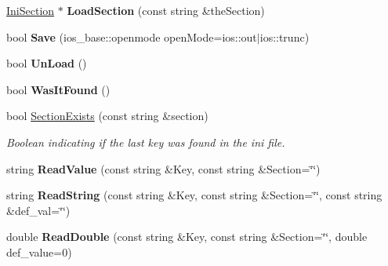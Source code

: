 \begin{DoxyCompactItemize}
\item 
\hypertarget{classrr_1_1_ini_file_af6b76931e49087a27695b7a27ed04a42}{\hyperlink{classrr_1_1_ini_section}{Ini\-Section} $\ast$ {\bfseries Load\-Section} (const string \&the\-Section)}\label{classrr_1_1_ini_file_af6b76931e49087a27695b7a27ed04a42}

\item 
\hypertarget{classrr_1_1_ini_file_a2485647178f4b9c733b5a5abb54b3bf2}{bool {\bfseries Save} (ios\-\_\-base\-::openmode open\-Mode=ios\-::out$|$ios\-::trunc)}\label{classrr_1_1_ini_file_a2485647178f4b9c733b5a5abb54b3bf2}

\item 
\hypertarget{classrr_1_1_ini_file_abd7e7981536ea59c2171ac3304c76ccd}{bool {\bfseries Un\-Load} ()}\label{classrr_1_1_ini_file_abd7e7981536ea59c2171ac3304c76ccd}

\item 
\hypertarget{classrr_1_1_ini_file_aff8ccbf611e3a58769005a6cdc627f8a}{bool {\bfseries Was\-It\-Found} ()}\label{classrr_1_1_ini_file_aff8ccbf611e3a58769005a6cdc627f8a}

\item 
\hypertarget{classrr_1_1_ini_file_a0f6042f001ebab2e3b2e29ae69c10f84}{bool \hyperlink{classrr_1_1_ini_file_a0f6042f001ebab2e3b2e29ae69c10f84}{Section\-Exists} (const string \&section)}\label{classrr_1_1_ini_file_a0f6042f001ebab2e3b2e29ae69c10f84}

\begin{DoxyCompactList}\small\item\em Boolean indicating if the last key was found in the ini file. \end{DoxyCompactList}\item 
\hypertarget{classrr_1_1_ini_file_a910bafca6c0bdcf5d267f37ee18bddfb}{string {\bfseries Read\-Value} (const string \&Key, const string \&Section=\char`\"{}\char`\"{})}\label{classrr_1_1_ini_file_a910bafca6c0bdcf5d267f37ee18bddfb}

\item 
\hypertarget{classrr_1_1_ini_file_a67876ac86232543dcb885d5e5a20b58a}{string {\bfseries Read\-String} (const string \&Key, const string \&Section=\char`\"{}\char`\"{}, const string \&def\-\_\-val=\char`\"{}\char`\"{})}\label{classrr_1_1_ini_file_a67876ac86232543dcb885d5e5a20b58a}

\item 
\hypertarget{classrr_1_1_ini_file_ae9861c538c12de4141984157a1593c53}{double {\bfseries Read\-Double} (const string \&Key, const string \&Section=\char`\"{}\char`\"{}, double def\-\_\-value=0)}\label{classrr_1_1_ini_file_ae9861c538c12de4141984157a1593c53}


\end{DoxyCompactItemize}
